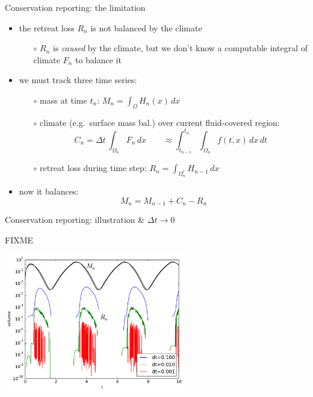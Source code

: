 \documentclass[xcolor={dvipsnames}]{beamer}
\begin{document}
\begin{frame}{Conservation reporting: the limitation}

\begin{itemize}
\item \alert{the retreat loss $R_n$ is not balanced by the climate}
  \begin{itemize}
  \item[$\circ$] $R_n$ is \emph{caused} by the climate, but we don't know a computable integral of climate $F_n$ to balance it
  \end{itemize}
\item we must track \alert{three} time series:
  \begin{itemize}
  \item[$\circ$] mass at time $t_n$: \qquad $M_n = \int_\Omega H_n(x)\,dx$

  \smallskip
  \item[$\circ$] climate (e.g.~surface mass bal.) over current fluid-covered region:
     $$C_n = \Delta t\, \int_{\Omega_n} F_n \,dx \qquad \approx \int_{t_{n-1}}^{t_n} \int_{\Omega_n} f(t,x) \,dx\,dt$$
  \item[$\circ$] retreat loss during time step: \qquad $R_n = \int_{\Omega_n^r} H_{n-1} \,dx$
  \end{itemize}
\item now it balances:
     $$M_n = M_{n-1} + C_n - R_n$$
\end{itemize}
\end{frame}


\begin{frame}{Conservation reporting: illustration \& $\Delta t\to 0$}

\begin{center}
\vspace{-3.3mm}

FIXME

\vspace{-1.1mm}
\includegraphics[width=0.59\textwidth,keepaspectratio=true]{masstimeseries} \, \phantom{!}
\end{center}
\end{frame}
\end{document}
